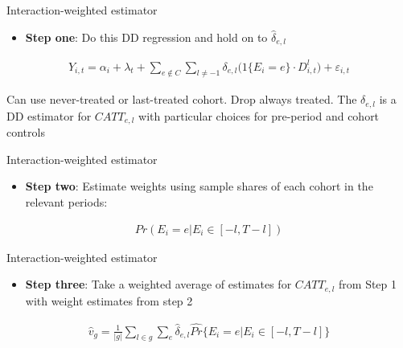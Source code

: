 \documentclass{beamer}
\begin{document}
\begin{frame}{Interaction-weighted estimator}

\begin{itemize}
\item \textbf{Step one}: Do this DD regression and hold on to $\widehat{\delta}_{e,l}$
\end{itemize}

\begin{eqnarray*}
Y_{i,t} = \alpha_i + \lambda_t + \sum_{e \notin C} \sum_{l \neq -1} \delta_{e,l} \big (1 \{ E_i = e \} \cdot D_{i,t}^l \big ) + \varepsilon_{i,t}
\end{eqnarray*}


\bigskip

Can use never-treated or last-treated cohort. Drop always treated. The $\delta_{e,l}$ is a DD estimator for $CATT_{e,l}$ with particular choices for pre-period and cohort controls

\end{frame}


\begin{frame}{Interaction-weighted estimator}

\begin{itemize}
\item \textbf{Step two}: Estimate weights using sample shares of each cohort in the relevant periods:
\end{itemize}

\begin{eqnarray*}
Pr(E_i=e|E_i \in [-l,T-l])
\end{eqnarray*}

\end{frame}

\begin{frame}{Interaction-weighted estimator}

\begin{itemize}
\item \textbf{Step three}: Take a weighted average of estimates for $CATT_{e,l}$ from Step 1 with weight estimates from step 2
\end{itemize}


\begin{eqnarray*}
\widehat{v}_g = \frac{1}{|g|} \sum_{l \in g} \sum_e \widehat{\delta}_{e,l} \widehat{Pr} \{ E_i=e | E_i \in [-l,T-l]\}
\end{eqnarray*}


\end{frame}
\end{document}
